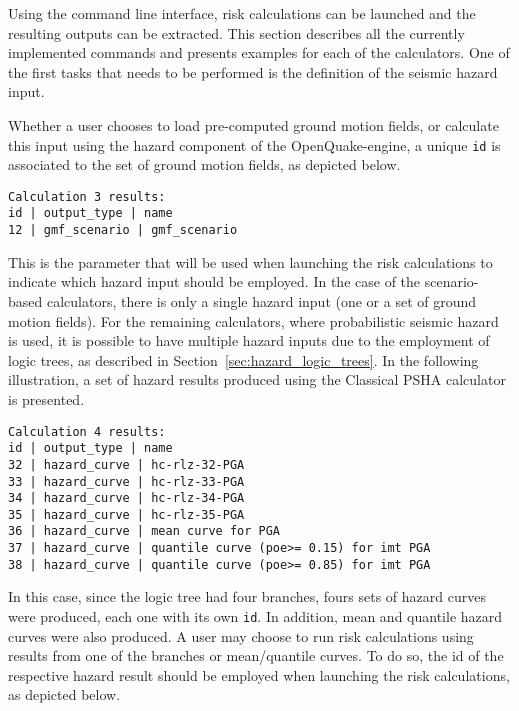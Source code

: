 Using the command line interface, risk calculations can be launched and the
resulting outputs can be extracted. This section describes all the currently
implemented commands and presents examples for each of the calculators. One of
the first tasks that needs to be performed is the definition of the seismic
hazard input.

Whether a user chooses to load pre-computed ground motion fields, or calculate
this input using the hazard component of the OpenQuake-engine, a unique
\verb+id+ is associated to the set of ground motion fields, as depicted below.

\begin{Verbatim}[frame=single, commandchars=\\\{\}, samepage=true]
Calculation 3 results:
id | output_type | name
12 | gmf_scenario | gmf_scenario
\end{Verbatim}

This is the parameter that will be used when launching the risk calculations
to indicate which hazard input should be employed. In the case of the
scenario-based calculators, there is only a single hazard input (one or a set
of ground motion fields). For the remaining calculators, where probabilistic
seismic hazard is used, it is possible to have multiple hazard inputs due to
the employment of logic trees, as described in
Section~\ref{sec:hazard_logic_trees}. In the following illustration, a set of
hazard results produced using the Classical PSHA calculator is presented.

\begin{Verbatim}[frame=single, commandchars=\\\{\}, samepage=true]
Calculation 4 results:
id | output_type | name
32 | hazard_curve | hc-rlz-32-PGA
33 | hazard_curve | hc-rlz-33-PGA
34 | hazard_curve | hc-rlz-34-PGA
35 | hazard_curve | hc-rlz-35-PGA
36 | hazard_curve | mean curve for PGA
37 | hazard_curve | quantile curve (poe>= 0.15) for imt PGA
38 | hazard_curve | quantile curve (poe>= 0.85) for imt PGA
\end{Verbatim}

In this case, since the logic tree had four branches, fours sets of hazard
curves were produced, each one with its own \verb+id+. In addition, mean and
quantile hazard curves were also produced. A user may choose to run risk
calculations using results from one of the branches or mean/quantile curves.
To do so, the id of the respective hazard result should be employed when
launching the risk calculations, as depicted below.

